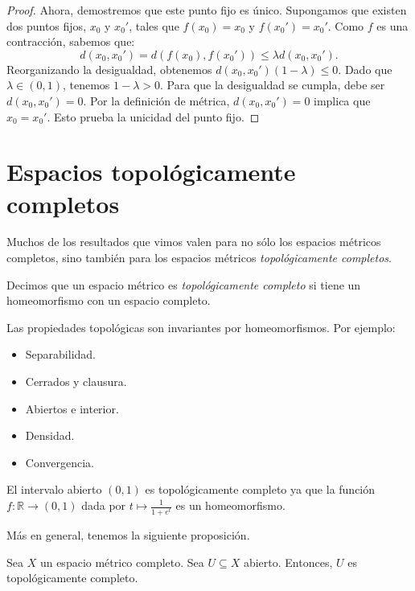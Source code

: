 \begin{proof}
	Ahora, demostremos que este punto fijo es único.
	Supongamos que existen dos puntos fijos, $x_0$ y $x_0'$, tales que $f(x_0) = x_0$ y $f(x_0') = x_0'$.
	Como $f$ es una contracción, sabemos que:
	$$d(x_0, x_0') = d(f(x_0), f(x_0')) \le \lambda d(x_0, x_0').$$
	Reorganizando la desigualdad, obtenemos $d(x_0, x_0') (1 - \lambda) \le 0$.
	Dado que $\lambda \in (0,1)$, tenemos $1 - \lambda > 0$. Para que la desigualdad se cumpla, debe ser $d(x_0, x_0') = 0$.
	Por la definición de métrica, $d(x_0, x_0') = 0$ implica que $x_0 = x_0'$. Esto prueba la unicidad del punto fijo.
\end{proof}


\section{Espacios topológicamente completos}

Muchos de los resultados que vimos valen para no sólo los espacios métricos completos, sino también para los espacios métricos \textit{topológicamente completos}.

\begin{definition}
	Decimos que un espacio métrico es \emph{topológicamente completo} si tiene un homeomorfismo con un espacio completo.
\end{definition}

Las propiedades topológicas son invariantes por homeomorfismos. Por ejemplo:
\begin{itemize}
	\item Separabilidad.
	\item Cerrados y clausura.
	\item Abiertos e interior.
	\item Densidad.
	\item Convergencia.
\end{itemize}

\begin{example}
	El intervalo abierto $(0, 1)$ es topológicamente completo ya que la función $f : \mathbb{R} \to (0, 1)$ dada por $t \mapsto \frac{1}{1 + e^t}$ es un homeomorfismo.
\end{example}

Más en general, tenemos la siguiente proposición.

\begin{proposition}
	Sea $X$ un espacio métrico completo. Sea $U \subseteq X$ abierto. Entonces, $U$ es topológicamente completo.
\end{proposition}

